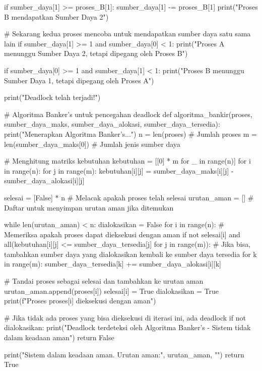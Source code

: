\documentclass[12pt]{article}
\begin{document}
\begin{itemize}
\begin{python}
    if sumber_daya[1] >= proses_B[1]:
        sumber_daya[1] -= proses_B[1]
        print("Proses B mendapatkan Sumber Daya 2")
    
    # Sekarang kedua proses mencoba untuk mendapatkan sumber daya satu sama lain
    if sumber_daya[1] >= 1 and sumber_daya[0] < 1:
        print("Proses A menunggu Sumber Daya 2, tetapi dipegang oleh Proses B")

    if sumber_daya[0] >= 1 and sumber_daya[1] < 1:
        print("Proses B menunggu Sumber Daya 1, tetapi dipegang oleh Proses A")
        
    print("Deadlock telah terjadi!\n")

# Algoritma Banker's untuk pencegahan deadlock
def algoritma_bankir(proses, sumber_daya_maks, sumber_daya_alokasi, sumber_daya_tersedia):
    print("Menerapkan Algoritma Banker's...")
    n = len(proses)  # Jumlah proses
    m = len(sumber_daya_maks[0])  # Jumlah jenis sumber daya

    # Menghitung matriks kebutuhan
    kebutuhan = [[0] * m for _ in range(n)]
    for i in range(n):
        for j in range(m):
            kebutuhan[i][j] = sumber_daya_maks[i][j] - sumber_daya_alokasi[i][j]

    selesai = [False] * n  # Melacak apakah proses telah selesai
    urutan_aman = []    # Daftar untuk menyimpan urutan aman jika ditemukan
    
    while len(urutan_aman) < n:
        dialokasikan = False
        for i in range(n):
            # Memeriksa apakah proses dapat dieksekusi dengan aman
            if not selesai[i] and all(kebutuhan[i][j] <= sumber_daya_tersedia[j] for j in range(m)):
                # Jika bisa, tambahkan sumber daya yang dialokasikan kembali ke sumber daya tersedia
                for k in range(m):
                    sumber_daya_tersedia[k] += sumber_daya_alokasi[i][k]
                
                # Tandai proses sebagai selesai dan tambahkan ke urutan aman
                urutan_aman.append(proses[i])
                selesai[i] = True
                dialokasikan = True
                print(f"Proses {proses[i]} dieksekusi dengan aman")
        
        # Jika tidak ada proses yang bisa dieksekusi di iterasi ini, ada deadlock
        if not dialokasikan:
            print("Deadlock terdeteksi oleh Algoritma Banker's - Sistem tidak dalam keadaan aman\n")
            return False

    print("Sistem dalam keadaan aman. Urutan aman:", urutan_aman, "\n")
    return True


\end{python}
\end{itemize}
\end{document}
